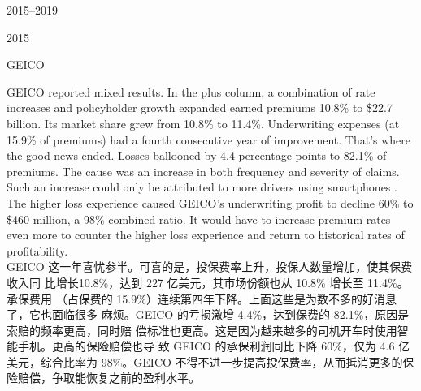 \begin{chapter}{2015--2019}
\begin{section}{2015}
\begin{subsection}{GEICO}
\begin{verseparallel}
  {
    GEICO reported mixed results. In the plus column, a combination of rate
    increases and policyholder growth expanded earned premiums 10.8\% to \$22.7
    billion. Its market share grew from 10.8\% to 11.4\%. Underwriting expenses
    (at 15.9\% of premiums) had a fourth consecutive year of improvement.
    That's where the good news ended. Losses ballooned by 4.4 percentage points
    to 82.1\% of premiums. The cause was an increase in both frequency and
    severity of claims. Such an increase could only be attributed to more
    drivers using smartphones . The higher loss
    experience caused GEICO's underwriting profit to decline 60\% to \$460
    million, a 98\% combined ratio. It would have to increase premium rates even
    more to counter the higher loss experience and return to historical rates of
    profitability. \\
  }
  {
    GEICO 这一年喜忧参半。可喜的是，投保费率上升，投保人数量增加，使其保费收入同
    比增长10.8\%，达到 227 亿美元，其市场份额也从 10.8\% 增长至 11.4\%。承保费用
    （占保费的 15.9\%）连续第四年下降。上面这些是为数不多的好消息了，它也面临很多
    麻烦。GEICO 的亏损激增 4.4\%，达到保费的 82.1\%，原因是索赔的频率更高，同时赔
    偿标准也更高。这是因为越来越多的司机开车时使用智能手机。更高的保险赔偿也导
    致 GEICO 的承保利润同比下降 60\%，仅为 4.6 亿美元，综合比率为 98\%。GEICO
    不得不进一步提高投保费率，从而抵消更多的保险赔偿，争取能恢复之前的盈利水平。
  }
\end{verseparallel}
\end{subsection}


\end{section}
\end{chapter}
